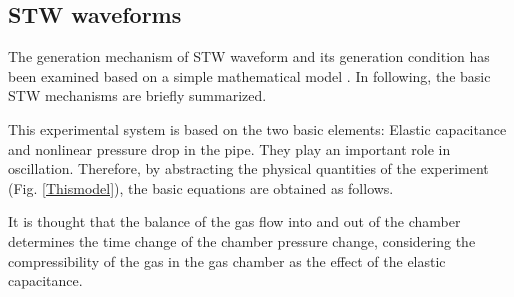 \documentclass[aps,pre,preprint,groupedaddress,showkeys]{revtex4-2}
\begin{document}
\subsection{STW waveforms}
The generation mechanism of STW waveform and its generation condition has been examined based on a simple mathematical model \citep{kanno2018}.
In following, the basic STW mechanisms are briefly summarized.

This experimental system is based on the two basic elements: Elastic capacitance and nonlinear pressure drop in the pipe. 
They play an important role in oscillation.
Therefore, by abstracting the physical quantities of the experiment (Fig. \ref{Thismodel}), the basic equations are obtained as follows.
 
It is thought that the balance of the gas flow into and out of the chamber determines the time change of the chamber pressure change, considering the compressibility of the gas in the gas chamber as the effect of the elastic capacitance.
\end{document}
